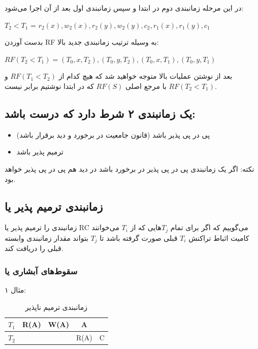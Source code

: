 \documentclass[a4paper]{article}
\begin{document}
در این مرحله زمانبندی دوم در ابتدا و سپس زمانبندی اول بعد از آن اجرا می‌شود:

\begin{LTR}
$T_{2} < T_{1}$ = $r_{2}(x), w_{2}(x), r_{2}(y), w_{2}(y), c_{2}, r_{1}(x), r_{1}(y), c_{1}$
\end{LTR}

بدست آوردن RF به وسیله ترتیب زمانبندی جدید بالا:

\begin{LTR}
$RF(T_{2} < T_{1}) = (T_{0}, x, T_{2}), (T_{0}, y, T_{2}), (T_{0}, x, T_{1}), (T_{0}, y, T_{1})$
\end{LTR}

بعد از نوشتن عملیات بالا متوجه خواهید شد که هیچ کدام از $RF(T_{1} < T_{2})$ و
$RF(T_{2} < T_{1})$ با مرجع اصلی $RF(S)$ که در ابتدا نوشتیم برابر نیست.

\subsection{یک زمانبندی ۲ شرط دارد که درست باشد:}

\begin{itemize}
    \item پی در پی پذیر باشد (قانون جامعیت در برخورد و دید برقرار باشد)
    \item ترمیم پذیر باشد
\end{itemize}

نکته: اگر یک زمانبندی پی در پی پذیر در برخورد باشد در دید هم پی در پی پذیر خواهد بود.

\subsection{زمانبندی ترمیم پذیر یا }

زمانبندی را ترمیم پذیر یا RC می‌گوییم که اگر برای تمام $T_{j}$هایی که از $T_{i}$
می‌خوانند کامیت اثباط تراکنش $T_{i}$ قبلی صورت گرفته باشد تا $T_{j}$ بتواند
مقدار زمانبندی وابسته قبلی را دریافت کند.

\subsubsection{سقوط‌های آبشاری یا }

مثال ۱:

\begin{LTR}
    \begin{table}[h]
        \centering
        \begin{RTL}
            \caption{زمانبندی ترمیم ناپذیر}
        \end{RTL}
        \begin{tabular}{c|c|c|c|c}
            $T_{1}$ & R(A) & W(A) & A & \\ \hline
            $T_{2}$ & & & R(A) & C \\
        \end{tabular}
    \end{table}
\end{LTR}
\end{document}
